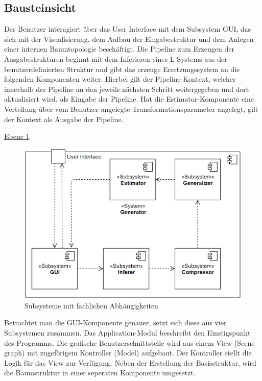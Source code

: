 \newpage

\subsection*{Bausteinsicht}
Der Benutzer interagiert über das User Interface mit dem Subsystem GUI, das sich mit der Visualisierung, dem Aufbau der
Eingabestruktur und dem Anlegen einer internen Baumtopologie beschäftigt.
Die Pipeline zum Erzeugen der Ausgabestrukturen beginnt mit dem Inferieren eines L-Systems aus der benutzerdefinierten
Struktur und gibt das erzeuge Ersetzungssystem an die folgenden Komponenten weiter.
Hierbei gilt der Pipeline-Kontext, welcher innerhalb der Pipeline an den jeweils nächsten Schritt weitergegeben und
dort aktualisiert wird, als Eingabe der Pipeline.
Hat die Estimator-Komponente eine Verteilung über vom Benutzer angelegte Transformationsparameter angelegt, gilt
der Kontext als Ausgabe der Pipeline.

\underline{Ebene 1}
\begin{figure}[H]
    \centering
    \includegraphics[width=12cm]{../images/Bausteinsicht_Ebene_1.PNG}
    \caption{Subsysteme mit fachlichen Abhängigkeiten}
\end{figure}

Betrachtet man die GUI-Komponente genauer, setzt sich diese aus vier Subsystemen zusammen.
Das Application-Modul beschreibt den Einstigspunkt des Programms.
Die grafische Benutzerschnittstelle wird aus einem View (Scene graph) mit zugeförigem Kontroller (Model)
aufgebaut.
Der Kontroller stellt die Logik für das View zur Verfügung.
Neben der Erstellung der Basisstruktur, wird die Baumstruktur in einer seperaten Komponente umgesetzt.

